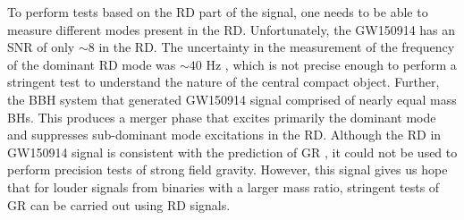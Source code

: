
To perform tests based on the RD part of the signal, one needs to be able to measure different modes present in the RD.  Unfortunately, the GW150914 has an SNR of only $\sim 8$ in the RD. The uncertainty in the measurement of the frequency of the dominant RD mode was $\sim 40$ Hz \cite{TheLIGOScientific:2016src}, which is not precise enough to perform a stringent test to understand the nature of the central compact object. Further, the BBH system that generated GW150914 signal comprised of nearly equal mass BHs. This produces a merger phase that excites primarily the dominant mode and suppresses sub-dominant mode excitations in the RD.  Although the RD in GW150914 signal is consistent with the prediction of GR \cite{TheLIGOScientific:2016src}, it could not be used to perform precision tests of strong field gravity. However, this signal gives us hope that for louder signals from binaries with a larger mass ratio, stringent tests of GR can be carried out using RD signals. 



